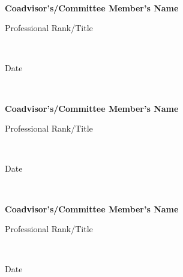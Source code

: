 \begin{titlepage}
\hspace{4.5cm} \hrulefill\

\vspace{-0.5cm}

\hspace{4.5cm}
\textbf{Coadvisor's/Committee Member's Name}

\vspace{-.5cm}

\hspace{4.5cm} Professional Rank/Title

\vspace{-0.25cm}

\hspace{4.5cm} \hrulefill\

\vspace{-0.5cm}

\hspace{4.5cm}
Date

\hspace{4.5cm} \hrulefill\

\vspace{-0.5cm}

\hspace{4.5cm}
\textbf{Coadvisor's/Committee Member's Name}

\vspace{-.5cm}

\hspace{4.5cm} Professional Rank/Title

\vspace{-0.25cm}

\hspace{4.5cm} \hrulefill\

\vspace{-0.5cm}

\hspace{4.5cm}
Date

\hspace{4.5cm} \hrulefill\

\vspace{-0.5cm}

\hspace{4.5cm}
\textbf{Coadvisor's/Committee Member's Name}

\vspace{-.5cm}

\hspace{4.5cm} Professional Rank/Title

\vspace{-0.25cm}

\hspace{4.5cm} \hrulefill\

\vspace{-0.5cm}

\hspace{4.5cm}
Date
\end{titlepage}